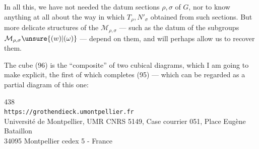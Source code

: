 In all this, we have not needed the datum  sections $\rho,\sigma$
of $G$, nor to know anything at all about the way in which $T_\rho,N'_\sigma$
 obtained from such sections.
But more delicate  structures of the
$\mathcal{M}_{\rho,\sigma}$ --- such as the datum of the
 subgroups $\mathcal{M}_{\rho,\sigma}\unsure{(w)|(\omega)}$ ---
depend on them, and will perhaps allow us to recover them.

\uline{} The cube (96) is the ``composite'' of two cubical
diagrams, which I am going to make explicit, the first of which completes (95) --- which can
be regarded as a partial diagram of this one:


\begin{center}
{\small
438\\
\texttt{https://grothendieck.umontpellier.fr}\\
Université de Montpellier, UMR CNRS 5149, Case courrier 051, Place Eugène Bataillon\\
34095 Montpellier cedex 5 - France
}
\end{center}


